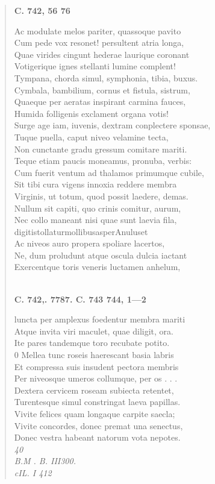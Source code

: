 \documentclass[11pt, a4paper]{report}
\begin{document}
\begin{verse}
     \marginpar{[228]} \begin{center} \textbf{C. 742, 56 76} \end{center}Ac modulate melos pariter, quassoque pavito \\ Cum pede vox resonet! persultent atria longa, \\ Quae virides cingunt hederae laurique coronant \\ Votigerique ignes stellanti lumine complent! \\ Tympana, chorda simul, symphonia, tibia, buxus. \\ Cymbala, bambilium, cornus et fistula, sistrum, \\ Quaeque per aeratas inspirant carmina fauces, \\ Humida folligenis exclament organa votis! \\ Surge age iam, iuvenis, dextram conplectere sponsae, \\ Tuque puella, caput niveo velamine tecta, \\ Non cunctante gradu gressum comitare mariti. \\ Teque etiam paucis moneamus, pronuba, verbis: \\ Cum fuerit ventum ad thalamos primumque cubile, \\ Sit tibi cura vigens innoxia reddere membra \\ Virginis, ut totum, quod possit laedere, demas. \\ Nullum sit capiti, quo crinis comitur, aurum, \\ Nec collo maneant nisi quae sunt laevia fila, \\ digitistollaturmollibusasperAnuluset \\ Ac niveos auro propera spoliare lacertos, \\ Ne, dum proludunt atque oscula dulcia iactant \\ Exercentque toris veneris luctamen anhelum, \\ 
        ﻿\pagebreak 
    \begin{center} \textbf{C. 742,. 7787. C. 743 744, 1—2} \end{center} \marginpar{[229]} luncta per amplexus foedentur membra mariti \\ Atque invita viri maculet, quae diligit, ora. \\ Ite pares tandemque toro recubate potito. \\ 0 Mellea tunc roseis haerescant basia labris \\ Et compressa suis insudent pectora membris \\ Per \rbrack  niveosque umeros collumque, per os . . . \\ Dextera cervicem roseam subiecta retentet, \\ Turentesque simul constringat laeva papillas. \\ Vivite felices quam longaque carpite saecla; \\ Vivite concordes, donec premat una senectus, \\ Donec \rbrack  vestra habeant natorum vota nepotes. \\ \textit{40} \\ \textit{B.M . B. III300.} \\ \textit{cIL. I 412} \\ 

\end{verse}
\end{document}
